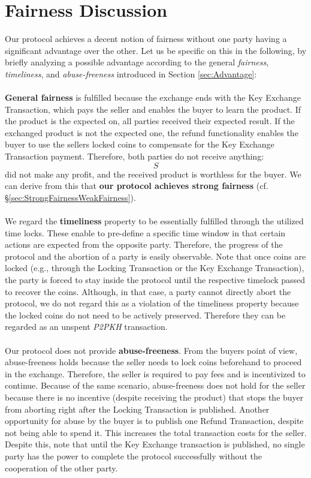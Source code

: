\documentclass{cacthesis}
\newcounter{protocol}
\begin{document}
        
        \section{Fairness Discussion}
        \label{sec:FairnessDiscussion}
	    Our protocol achieves a decent notion of fairness without one party having a significant advantage over the other. Let us be specific on this in the following, by briefly analyzing a possible advantage according to the general \textit{fairness}, \textit{timeliness}, and \textit{abuse-freeness} introduced in Section \ref{sec:Advantage}: \\\\
        \textbf{General fairness} is fulfilled because the exchange ends with the Key Exchange Transaction, which pays the seller and enables the buyer to learn the product. If the product is the expected on, all parties received their expected result. If the exchanged product is not the expected one, the refund functionality enables the buyer to use the sellers locked coins to compensate for the Key Exchange Transaction payment. Therefore, both parties do not receive anything: $$S$$ did not make any profit, and the received product is worthless for the buyer. We can derive from this that \textbf{our protocol achieves strong fairness} (cf. §\ref{sec:StrongFairnessWeakFairness}). \\\\
        We regard the \textbf{timeliness} property to be essentially fulfilled through the utilized time locks. These enable to pre-define a specific time window in that certain actions are expected from the opposite party. Therefore, the progress of the protocol and the abortion of a party is easily observable. Note that once coins are locked (e.g., through the Locking Transaction or the Key Exchange Transaction), the party is forced to stay inside the protocol until the respective timelock passed to recover the coins. Although, in that case, a party cannot directly abort the protocol, we do not regard this as a violation of the timeliness property because the locked coins do not need to be actively preserved. Therefore they can be regarded as an unspent \textit{P2PKH} transaction. \\\\
        Our protocol does not provide \textbf{abuse-freeness}. From the buyers point of view, abuse-freeness holds because the seller needs to lock coins beforehand to proceed in the exchange. Therefore, the seller is required to pay fees and is incentivized to continue. Because of the same scenario, abuse-freeness does not hold for the seller because there is no incentive (despite receiving the product) that stops the buyer from aborting right after the Locking Transaction is published. Another opportunity for abuse by the buyer is to publish one Refund Transaction, despite not being able to spend it. This increases the total transaction costs for the seller. Despite this, note that until the Key Exchange transaction is published, no single party has the power to complete the protocol successfully without the cooperation of the other party. \\\\
\end{document}
